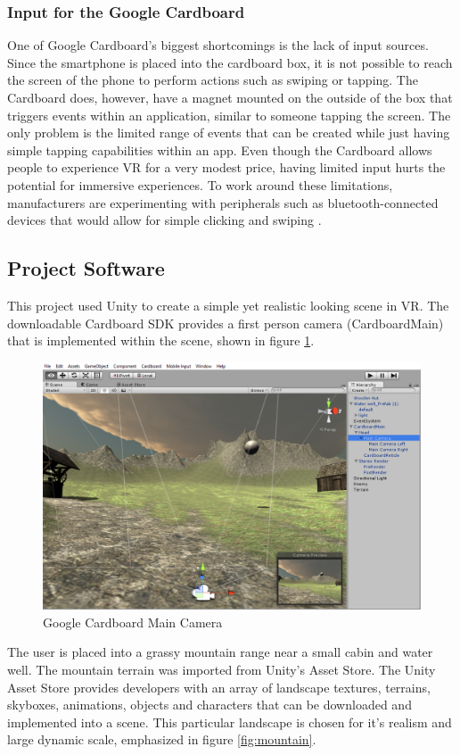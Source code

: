 \documentclass[12pt]{article}
\begin{document}
\subsubsection{Input for the Google Cardboard}
One of Google Cardboard's biggest shortcomings is the lack of input sources. Since the smartphone is placed into the cardboard box, it is not possible to reach the screen of the phone to perform actions such as swiping or tapping. The Cardboard does, however, have a magnet mounted on the outside of the box that triggers events within an application, similar to someone tapping the screen. The only problem is the limited range of events that can be created while just having simple tapping capabilities within an app. Even though the Cardboard allows people to experience VR for a very modest price, having limited input hurts the potential for immersive experiences. To work around these limitations, manufacturers are experimenting with peripherals such as bluetooth-connected devices that would allow for simple clicking and swiping \cite{parisi}.

\subsection{Project Software}
This project used Unity to create a simple yet realistic looking scene in VR. The downloadable Cardboard SDK provides a first person camera (CardboardMain) that is implemented within the scene, shown in figure \ref{fig:maincamera}.
 \begin{figure}[h]
    \centering
 \includegraphics[width=.65\textwidth]{Software10}
  \caption{Google Cardboard Main Camera}
  \label{fig:maincamera}
 \end{figure}
The user is placed into a grassy mountain range near a small cabin and water well. The mountain terrain was imported from Unity's Asset Store. The Unity Asset Store provides developers with an array of landscape textures, terrains, skyboxes, animations, objects and characters that can be downloaded and implemented into a scene. This particular landscape is chosen %
for it's realism and large dynamic scale, emphasized in figure \ref{fig:mountain}.  
\end{document}
